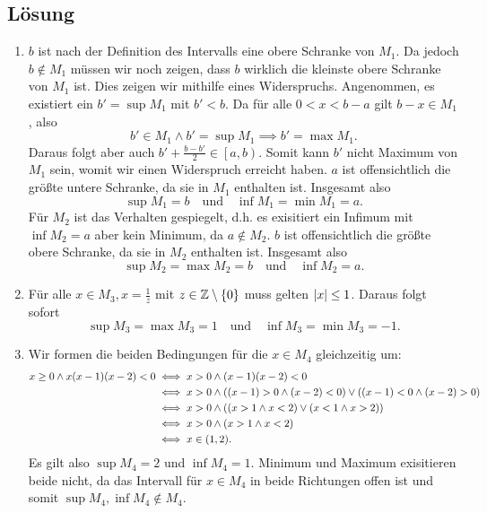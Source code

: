 \documentclass[german,12pt]{homework}
\newcommand{\ZZ}{\mathbb{Z}}
\DeclarePairedDelimiter{\absolute}{\lvert}{\rvert}
\DeclarePairedDelimiter{\enbrace}{(}{)}
\DeclarePairedDelimiter{\penbrace}{\{}{\}}
\begin{document}
    \subsection*{Lösung}
    \begin{enumerate}
        \item \(b\) ist nach der Definition des Intervalls eine obere Schranke
        von \(M_1\). Da jedoch \(b \not\in M_1\) müssen wir noch zeigen, dass
        \(b\) wirklich die kleinste obere Schranke von \(M_1\) ist. Dies zeigen
        wir mithilfe eines Widerspruchs. Angenommen, es existiert ein \(b' =
        \sup{M_1}\) mit \(b' < b\). Da für alle \(0 < x < b - a\) gilt \(b - x
        \in M_1\), also
        \[b' \in M_1 \land b' = \sup{M_1} \implies b' = \max{M_1}.\]
        Daraus folgt aber auch \(b' + \frac{b - b'}{2} \in \left[a, b\right)\).
        Somit kann \(b'\) nicht Maximum von \(M_1\) sein, womit wir einen
        Widerspruch erreicht haben. \(a\) ist offensichtlich die größte untere
        Schranke, da sie in \(M_1\) enthalten ist. Insgesamt also
        \[\sup{M_1} = b \quad \text{und} \quad \inf{M_1} = \min{M_1} = a.\]
        Für \(M_2\) ist das Verhalten gespiegelt, d.h. es exisitiert ein
        Infimum mit \(\inf{M_2} = a\) aber kein Minimum, da \(a \not\in M_2\).
        \(b\) ist offensichtlich die größte obere Schranke, da sie in \(M_2\)
        enthalten ist. Insgesamt also
        \[\sup{M_2} = \max{M_2} = b \quad \text{und} \quad \inf{M_2} = a.\]
        \item Für alle \(x \in M_3, x = \frac{1}{z}\) mit \(z \in \ZZ \setminus
        \penbrace*{0}\) muss gelten \(\absolute*{x} \le 1\). Daraus folgt sofort
        \[\sup{M_3} = \max{M_3} = 1 \quad \text{und} \quad \inf{M_3} =
        \min{M_3} = -1.\]
        \item Wir formen die beiden Bedingungen für die \(x \in M_4\)
        gleichzeitig um:
        \begin{align*}
            x \ge 0 \land x\enbrace*{x - 1}\enbrace*{x - 2} < 0 &\iff x > 0
            \land \enbrace*{x - 1}\enbrace*{x - 2} < 0\\
            &\iff x > 0 \land \enbrace*{\enbrace*{x - 1} > 0 \land \enbrace*{x
            - 2} < 0} \lor \enbrace*{\enbrace*{x - 1} < 0 \land \enbrace*{x -
            2} > 0}\\
            & \iff x > 0 \land \enbrace*{\enbrace*{x > 1 \land x < 2} \lor
            \enbrace*{x < 1 \land x > 2}}\\
            & \iff x > 0 \land \enbrace*{x > 1 \land x < 2}\\
            & \iff x \in \enbrace*{1, 2}.
        \end{align*}
        Es gilt also \(\sup{M_4} = 2\) und \(\inf{M_4} = 1\). Minimum und
        Maximum exisitieren beide nicht, da das Intervall für \(x \in M_4\) in
        beide Richtungen offen ist und somit \(\sup{M_4}, \inf{M_4} \not\in
        M_4\).
    \end{enumerate}
\end{document}
